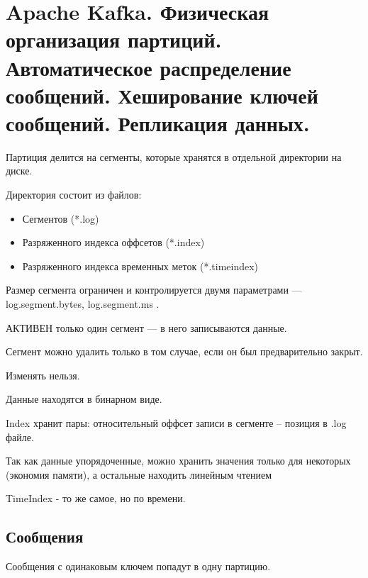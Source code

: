 \section{Apache Kafka. Физическая организация партиций. Автоматическое распределение сообщений. Хеширование ключей сообщений. Репликация данных.}

Партиция делится на сегменты, которые хранятся в отдельной директории на диске.

Директория состоит из файлов:
\begin{itemize}
    \item Сегментов (*.log)
    \item Разряженного индекса оффсетов (*.index)
    \item Разряженного индекса временных меток (*.timeindex)
\end{itemize}

Размер сегмента ограничен и контролируется 
двумя параметрами — log.segment.bytes, 
log.segment.ms .

АКТИВЕН только один сегмент —
в него записываются данные.

Сегмент можно удалить только в том случае, 
если он был предварительно закрыт.

Изменять нельзя.

Данные находятся в бинарном виде.

Index хранит пары: относительный оффсет записи в сегменте – позиция в .log 
файле.

Так как данные упорядоченные, можно хранить значения только для 
некоторых (экономия памяти), а остальные находить линейным чтением

TimeIndex - то же самое, но по времени.

\subsection*{Сообщения}


Сообщения с одинаковым ключем попадут в одну партицию.


